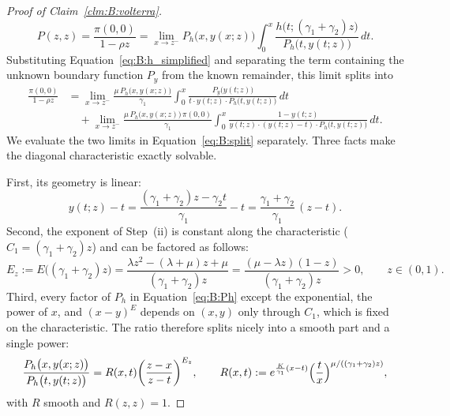 \begin{proof}[Proof of Claim~\ref{clm:B:volterra}]
    \begin{equation*}
        P(z,z)=\frac{\pi(0,0)}{1-\rho z}
        = \lim_{x\to z^-} P_h\bigl(x,y(x;z)\bigr)
          \int_0^x \frac{h\bigl(t;(\gamma_1+\gamma_2)z\bigr)}{P_h\bigl(t,y(t;z)\bigr)}\,dt.
    \end{equation*}
    Substituting Equation~\eqref{eq:B:h_simplified} and separating the term containing the unknown boundary function $P_y$ from the known remainder, this limit splits into
    \begin{align}
        \frac{\pi(0,0)}{1-\rho z}
        &= \lim_{x\to z^-}\frac{\mu\,P_h\bigl(x,y(x;z)\bigr)}{\gamma_1}
           \int_0^x \frac{P_y\bigl(y(t;z)\bigr)}{t\cdot y(t;z)\cdot P_h\bigl(t,y(t;z)\bigr)}\,dt
        \nonumber\\
        &\quad
        + \lim_{x\to z^-}\frac{\mu\,P_h\bigl(x,y(x;z)\bigr)\,\pi(0,0)}{\gamma_1}
           \int_0^x \frac{1-y(t;z)}{y(t;z)\cdot(y(t;z)-t)\cdot P_h\bigl(t,y(t;z)\bigr)}\,dt.
        \label{eq:B:split}
    \end{align}
    We evaluate the two limits in Equation~\eqref{eq:B:split} separately. Three facts make the diagonal characteristic exactly solvable.

    First, its geometry is linear:
    \begin{equation}
        y(t;z)-t = \frac{(\gamma_1+\gamma_2)z-\gamma_2 t}{\gamma_1}-t
        = \frac{\gamma_1+\gamma_2}{\gamma_1}\,(z-t).
    \label{eq:B:exact_linear}
    \end{equation}
    Second, the exponent of Step~(ii) is constant along the characteristic ($C_1=(\gamma_1+\gamma_2)z$) and can be factored as follows:
    \begin{equation*}
        E_z := E\bigl((\gamma_1+\gamma_2)z\bigr)
        = \frac{\lambda z^{2}-(\lambda+\mu)z+\mu}{(\gamma_1+\gamma_2)z}
        = \frac{(\mu-\lambda z)(1-z)}{(\gamma_1+\gamma_2)z}>0,
        \qquad z\in(0,1).
    \end{equation*}
    Third, every factor of $P_h$ in Equation~\eqref{eq:B:Ph} except the exponential, the power of $x$, and $(x-y)^{E}$ depends on $(x,y)$ only through $C_1$, which is fixed on the characteristic. The ratio therefore splits nicely into a smooth part and a single power:
    \begin{equation}
        \frac{P_h\bigl(x,y(x;z)\bigr)}{P_h\bigl(t,y(t;z)\bigr)}
        = R(x,t)\biggl(\frac{z-x}{z-t}\biggr)^{E_z},
    \qquad
    R(x,t):=e^{\frac{K}{\gamma_1}(x-t)}\Bigl(\frac{t}{x}\Bigr)^{\mu/((\gamma_1+\gamma_2)z)},
    \label{eq:B:ratio_exact}
    \end{equation}
    with $R$ smooth and $R(z,z)=1$.


\end{proof}
